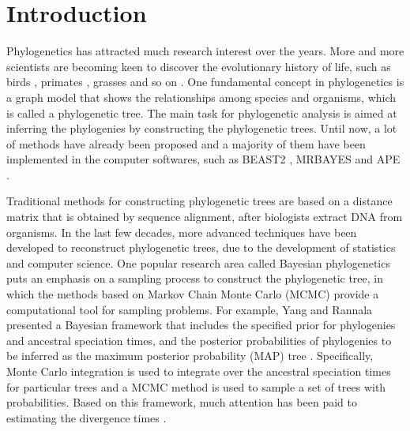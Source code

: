 \documentclass{bmcart}
\begin{document}
\section*{Introduction}
Phylogenetics has attracted much research interest over the years. More and more scientists are becoming keen to discover the evolutionary history of life, such as birds \cite{hackett2008phylogenomic}, primates \cite{szalay2013evolutionary}, grasses \cite{kellogg2001evolutionary} and so on \cite{sawabe2007inferring,garnery1992evolutionary}. One fundamental concept in phylogenetics is a graph model that shows the relationships among species and organisms, which is called a phylogenetic tree. The main task for phylogenetic analysis is aimed at inferring the phylogenies by constructing the phylogenetic trees. Until now, a lot of methods have already been proposed and a majority of them have been implemented in the computer softwares, such as BEAST2 \cite{drummond2007beast, bouckaert2014beast} , MRBAYES \cite{huelsenbeck2001mrbayes} and APE \cite{paradis2004ape}. 

Traditional methods for constructing phylogenetic trees are based on a distance matrix that is obtained by sequence alignment, after biologists extract DNA from organisms. In the last few decades, more advanced techniques have been developed to reconstruct phylogenetic trees, due to the development of statistics and computer science. One popular research area called Bayesian phylogenetics puts an emphasis on a sampling process to construct the phylogenetic tree, in which the methods based on Markov Chain Monte Carlo (MCMC) provide a computational tool for sampling problems. For example, Yang and Rannala presented a Bayesian framework that includes the specified prior for phylogenies and ancestral speciation times, and the posterior probabilities of phylogenies to be inferred as the maximum posterior probability (MAP) tree \cite{yang1997bayesian}. Specifically, Monte Carlo integration is used to integrate over the ancestral speciation times for particular trees and a MCMC method is used to sample a set of trees with probabilities. Based on this framework, much attention has been paid to estimating the divergence times \cite{rannala2003bayes,yang2003comparison,reis2011approximate}.  
\end{document}
